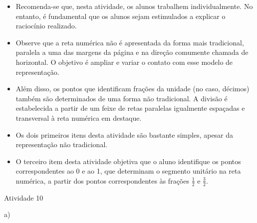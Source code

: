 \begin{multicols}{2}

\begin{itemize} %
    \item       Recomenda-se que, nesta atividade, os alunos trabalhem individualmente. No entanto, é fundamental que os alunos sejam estimulados a explicar o raciocínio realizado.
    \item       Observe que a reta numérica não é apresentada da forma mais tradicional, paralela a uma das margens da página e na direção comumente chamada de horizontal. O objetivo é ampliar e variar o contato com esse modelo de representação. 
    \item       Além disso, os pontos que identificam frações da unidade (no caso, décimos) também são determinados de uma forma não tradicional. A divisão é estabelecida a partir de um feixe de retas paralelas igualmente espaçadas e transversal à reta numérica em destaque. 
    \item       Os dois primeiros itens desta atividade são bastante simples, apesar da representação não tradicional. 
    \item       O terceiro item desta atividade objetiva que o aluno identifique os pontos correspondentes ao 0 e ao 1, que determinam o segmento unitário na reta numérica, a partir dos pontos correspondentes às frações       $\frac{1}{2}$       e       $\frac{3}{2}$.  
\end{itemize} %

\begin{resposta*}{Atividade 10}


a)

\end{resposta*}
\end{multicols}

